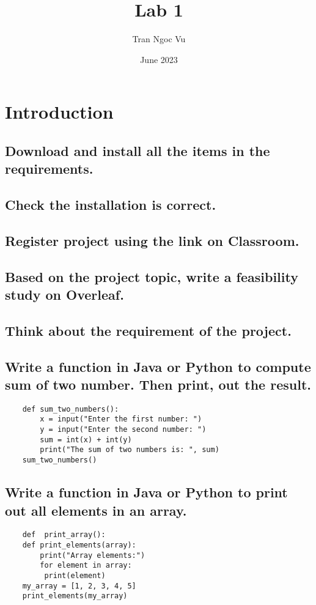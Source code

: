 \documentclass[11pt, letterpaper]{article}
\title{Lab 1}
\author{Tran Ngoc Vu}
\date{June 2023}
\begin{document}
\maketitle

\section{\Large \textbf{Introduction}}
\subsection{Download and install all the items in the requirements.}
\subsection{Check the installation is correct.}
\subsection{Register project using the link on Classroom.}
\subsection{Based on the project topic, write a feasibility study on Overleaf.}
\subsection{Think about the requirement of the project.}
\subsection{Write a function in Java or Python to compute sum of two number. Then print, out the result.}
\begin{verbatim}
    def sum_two_numbers():
        x = input("Enter the first number: ")
        y = input("Enter the second number: ")
        sum = int(x) + int(y)
        print("The sum of two numbers is: ", sum)
    sum_two_numbers()
\end{verbatim}
\subsection{Write a function in Java or Python to print out all elements in an array.}
\begin{verbatim}
    def  print_array():
    def print_elements(array):
        print("Array elements:")
        for element in array:
         print(element)
    my_array = [1, 2, 3, 4, 5]
    print_elements(my_array)
\end{verbatim}
\end{document}
